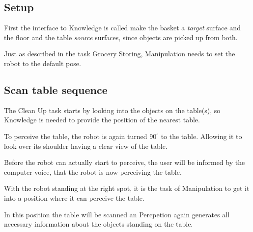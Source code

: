 \documentclass[main.tex]{subfiles}
\begin{document}
	\subsection{Setup}
	\begin{knowledge}	
	First the interface to Knowledge is called make the basket a \textit{target} surface and the floor and the table \textit{source} surfaces, since objects are picked up from both.
	\end{knowledge}
	
	\begin{manipulation}
	Just as described in the task Grocery Storing, Manipulation needs to set the robot to the default pose.
	\end{manipulation}

	\subsection{Scan table sequence}
	
	\begin{knowledge}
	The Clean Up task starts by looking into the objects on the table(s), so Knowledge is needed to provide the position of the nearest table.
	\end{knowledge}
	
	\begin{navigation}
	To perceive the table, the robot is again turned $90^\circ$ to the table. Allowing it to look over its shoulder having a clear view of the table.
	\end{navigation}
	
	\begin{nlp}
	Before the robot can actually start to perceive, the user will be informed by the computer voice, that the robot is now perceiving the table.
	\end{nlp}
	
	\begin{manipulation}
	With the robot standing at the right spot, it is the task of Manipulation to get it into a position where it can perceive the table.
   \end{manipulation} 
	
	\begin{perception}
	In this position the table will be scanned an Percpetion again generates all necessary information about the objects standing on the table.
	\end{perception}
	
\end{document}
